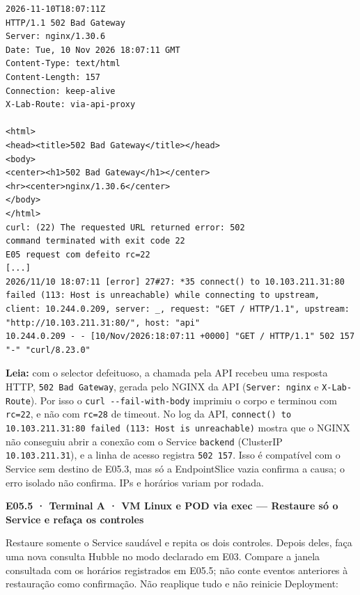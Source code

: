 \documentclass[12pt,openany,oneside,a4paper,chapter=TITLE,english,brazil]{abntex2}
\begin{document}
\begin{verbatim}
2026-11-10T18:07:11Z
HTTP/1.1 502 Bad Gateway
Server: nginx/1.30.6
Date: Tue, 10 Nov 2026 18:07:11 GMT
Content-Type: text/html
Content-Length: 157
Connection: keep-alive
X-Lab-Route: via-api-proxy

<html>
<head><title>502 Bad Gateway</title></head>
<body>
<center><h1>502 Bad Gateway</h1></center>
<hr><center>nginx/1.30.6</center>
</body>
</html>
curl: (22) The requested URL returned error: 502
command terminated with exit code 22
E05 request com defeito rc=22
[...]
2026/11/10 18:07:11 [error] 27#27: *35 connect() to 10.103.211.31:80 failed (113: Host is unreachable) while connecting to upstream, client: 10.244.0.209, server: _, request: "GET / HTTP/1.1", upstream: "http://10.103.211.31:80/", host: "api"
10.244.0.209 - - [10/Nov/2026:18:07:11 +0000] "GET / HTTP/1.1" 502 157 "-" "curl/8.23.0"
\end{verbatim}

\textbf{Leia:} com o selector defeituoso, a chamada pela API recebeu uma resposta HTTP, \texttt{502 Bad Gateway}, gerada pelo NGINX da API (\texttt{Server:\allowbreak{} nginx} e \texttt{X-{}\allowbreak{}Lab-{}\allowbreak{}Route}). Por isso o \texttt{curl -{}\allowbreak{}-{}\allowbreak{}fail-{}\allowbreak{}with-{}\allowbreak{}body} imprimiu o corpo e terminou com \texttt{rc=\allowbreak{}22}, e não com \texttt{rc=\allowbreak{}28} de timeout. No log da API, \texttt{connect(\allowbreak{}) to 10.\allowbreak{}103.\allowbreak{}211.\allowbreak{}31:\allowbreak{}80 failed (\allowbreak{}113:\allowbreak{} Host is unreachable)} mostra que o NGINX não conseguiu abrir a conexão com o Service \texttt{backend} (ClusterIP \texttt{10.\allowbreak{}103.\allowbreak{}211.\allowbreak{}31}), e a linha de acesso registra \texttt{502 157}. Isso é compatível com o Service sem destino de E05.3, mas só a EndpointSlice vazia confirma a causa; o erro isolado não confirma. IPs e horários variam por rodada.

\clearpage

\textbf{E05.5 · Terminal A · VM Linux e POD via exec --- Restaure só o Service e refaça os controles}

Restaure somente o Service saudável e repita os dois controles. Depois deles, faça uma nova consulta Hubble no modo declarado em E03. Compare a janela consultada com os horários registrados em E05.5; não conte eventos anteriores à restauração como confirmação. Não reaplique tudo e não reinicie Deployment:
\end{document}
